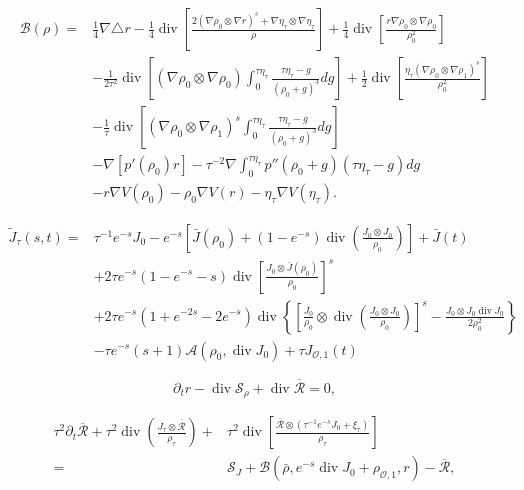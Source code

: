 \documentclass[10pt,a4paper]{amsart}
\def\d{{\partial}}
\DeclareMathOperator{\diver}{div}
\begin{document}
\begin{equation}\label{eq:opB}
\begin{aligned}
\mathcal{B}(\rho)=&\frac14\nabla\triangle r-\frac14\diver\left[\frac{2(\nabla\rho_0\otimes \nabla r)^s+\nabla \eta_\tau\otimes \nabla\eta_\tau}{\rho}\right]+\frac14\diver\left[\frac{r\nabla \rho_0\otimes\nabla\rho_0}{\rho_0^2}\right]\\
&-\frac{1}{2\tau^2}\diver\left[(\nabla \rho_0\otimes\nabla\rho_0) \int_0^{\tau \eta_\tau}\frac{\tau \eta_\tau-g}{(\rho_0+g)^3}dg\right]+\frac{1}{2}\diver\left[\frac{\eta_\tau(\nabla \rho_0\otimes\nabla\rho_1)^s}{\rho_0^2}\right]\\
&-\frac{1}{\tau}\diver\left[(\nabla\rho_0\otimes\nabla\rho_1)^s\int_0^{\tau \eta_\tau}\frac{\tau \eta_\tau-g}{(\rho_0+g)^3}dg\right]\\
&-\nabla[p'(\rho_0)r]-\tau^{-2}\nabla\int_0^{\tau \eta_\tau} p''(\rho_0+g)(\tau \eta_\tau-g)dg\\
&-r\nabla V(\rho_0)-\rho_0\nabla V(r)-\eta_\tau\nabla V(\eta_\tau).
\end{aligned}
\end{equation}

\begin{equation}\label{eq:J_aprx}
\begin{aligned}
\tilde J_\tau(s,t)=&\tau^{-1}e^{-s}J_0-e^{-s}\left[\bar J(\rho_0)+(1-e^{-s})\diver\left(\frac{J_0\otimes J_0}{\rho_0}\right)\right]+\bar J(t)\\
&+2\tau e^{-s}(1-e^{-s}-s)\diver\left[\frac{J_0\otimes \bar J(\rho_0)}{\rho_0}\right]^s\\
&+2\tau e^{-s}(1+e^{-2s}-2e^{-s})\diver\left\{\left[\frac{J_0}{\rho_0}\otimes\diver\left(\frac{J_0\otimes J_0}{\rho_0}\right)\right]^s-\frac{J_0\otimes J_0\diver J_0}{2\rho_0^2}\right\}\\
&-\tau e^{-s}(s+1)\mathcal{A}(\rho_0,\diver J_0)+\tau J_{\mathcal{O},1}(t)
\end{aligned}
\end{equation}

\begin{equation}\label{eq:dtr2}
\d_t r-\diver \mathcal{S}_\rho+\diver\overline{\mathcal{R}}=0,
\end{equation}

\begin{equation}\label{eq:dtR2}
\begin{aligned}
\tau^2\d_t\overline{\mathcal{R}}+\tau^2\diver\left(\frac{J_\tau\otimes\overline{\mathcal{R}}}{\rho_\tau}\right)+&\tau^2\diver\left[\frac{\overline{\mathcal{R}}\otimes(\tau^{-1}e^{-s}J_0+\xi_\tau)}{\rho_\tau}\right]\\
=&\mathcal{S}_J+\mathcal{B}(\bar\rho,e^{-s}\diver J_0+\rho_{\mathcal{O},1},r)-\overline{\mathcal{R}},
\end{aligned}
\end{equation}
\end{document}
